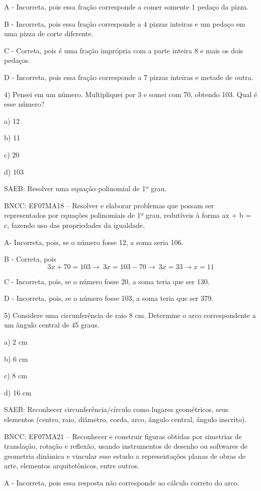 A - Incorreta, pois essa fração corresponde a comer somente 1 pedaço da
pizza.

B - Incorreta, pois essa fração corresponde a 4 pizzas inteiras e um
pedaço em uma pizza de corte diferente.

C - Correta, pois é uma fração imprópria com a parte inteira 8 e mais os
dois pedaços.

D - Incorreta, pois essa fração corresponde a 7 pizzas inteiras e metade
de outra.

4) Pensei em um número. Multipliquei por 3 e somei com 70, obtendo 103.
Qual é esse número?

a) 12

b) 11

c) 20

d) 103

SAEB: Resolver uma equação polinomial de 1º grau.

BNCC: EF07MA18 -- Resolver e elaborar problemas que possam ser
representados por equações polinomiais de 1º grau, redutíveis à forma ax
+ b = c, fazendo uso das propriedades da igualdade.

A- Incorreta, pois, se o número fosse 12, a soma seria 106.

B - Correta, pois
\[3x + 70 = 103 \rightarrow \ 3x = 103 - 70 \rightarrow \ 3x = 33 \rightarrow x = 11\]

C - Incorreta, pois, se o número fosse 20, a soma teria que ser 130.

D - Incorreta, pois, se o número fosse 103, a soma teria que ser 379.

5) Considere uma circunferência de raio 8 cm. Determine o arco
correspondente a um ângulo central de 45 graus.

a) 2 cm

b) 6 cm

c) 8 cm

d) 16 cm

SAEB: Reconhecer circunferência/círculo como lugares geométricos, seus
elementos (centro, raio, diâmetro, corda, arco, ângulo central, ângulo
inscrito).

BNCC: EF07MA21 -- Reconhecer e construir figuras obtidas por simetrias
de translação, rotação e reflexão, usando instrumentos de desenho ou
softwares de geometria dinâmica e vincular esse estudo a representações
planas de obras de arte, elementos arquitetônicos, entre outros.

A - Incorreta, pois essa resposta não corresponde ao cálculo correto do
arco.

